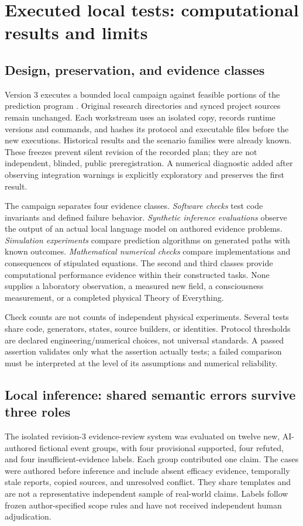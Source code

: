 \clearpage
\section{Executed local tests: computational results and limits}
\label{sec:local-tests}
\subsection{Design, preservation, and evidence classes}
Version 3 executes a bounded local campaign against feasible portions of the prediction program \cite{localtests}. Original research directories and synced project sources remain unchanged. Each workstream uses an isolated copy, records runtime versions and commands, and hashes its protocol and executable files before the new executions. Historical results and the scenario families were already known. These freezes prevent silent revision of the recorded plan; they are not independent, blinded, public preregistration. A numerical diagnostic added after observing integration warnings is explicitly exploratory and preserves the first result.

The campaign separates four evidence classes. \emph{Software checks} test code invariants and defined failure behavior. \emph{Synthetic inference evaluations} observe the output of an actual local language model on authored evidence problems. \emph{Simulation experiments} compare prediction algorithms on generated paths with known outcomes. \emph{Mathematical numerical checks} compare implementations and consequences of stipulated equations. The second and third classes provide computational performance evidence within their constructed tasks. None supplies a laboratory observation, a measured new field, a consciousness measurement, or a completed physical Theory of Everything.

Check counts are not counts of independent physical experiments. Several tests share code, generators, states, source builders, or identities. Protocol thresholds are declared engineering/numerical choices, not universal standards. A passed assertion validates only what the assertion actually tests; a failed comparison must be interpreted at the level of its assumptions and numerical reliability.

\subsection{Local inference: shared semantic errors survive three roles}
The isolated revision-3 evidence-review system was evaluated on twelve new, AI-authored fictional event groups, with four provisional supported, four refuted, and four insufficient-evidence labels. Each group contributed one claim. The cases were authored before inference and include absent efficacy evidence, temporally stale reports, copied sources, and unresolved conflict. They share templates and are not a representative independent sample of real-world claims. Labels follow frozen author-specified scope rules and have not received independent human adjudication.

